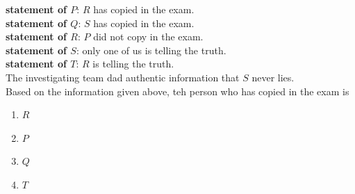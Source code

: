 \documentclass[journal]{IEEEtran}
\begin{document}
\begin{enumerate}
    \textbf{statement of $P$}: $R$ has copied in the exam.\\
    \textbf{statement of $Q$}: $S$ has copied in the exam.\\
    \textbf{statement of $R$}: $P$ did not copy in the exam.\\
    \textbf{statement of $S$}: only one of us is telling the truth.\\
    \textbf{statement of $T$}: $R$ is telling the truth.\\
    The investigating team dad authentic information that $S$ never lies.\\
    Based on the information given above, teh person who has copied in the exam is 
    \begin{enumerate}
        \item $R$
        \item $P$
        \item $Q$
        \item $T$
    \end{enumerate}
         

\end{enumerate}
\end{document}
